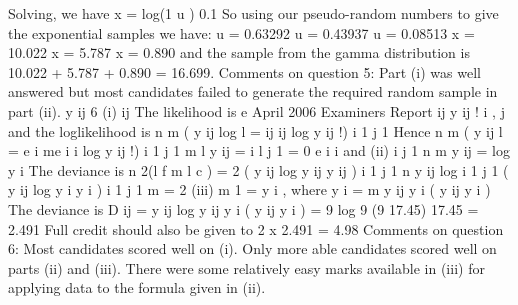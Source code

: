 \documentclass[a4paper,12pt]{article}
\begin{document}
Solving, we have x =
log(1 u )
0.1
So using our pseudo-random numbers to give the exponential samples we have:
u = 0.63292
u = 0.43937
u = 0.08513
x = 10.022
x = 5.787
x = 0.890
and the sample from the gamma distribution is
10.022 + 5.787 + 0.890 = 16.699.
Comments on question 5: Part (i) was well answered but most candidates failed to generate
the required random sample in part (ii).
y ij
6
(i)
ij
The likelihood is
e
April 2006
Examiners Report
ij
y ij !
i , j
and the loglikelihood is
n
m
( y ij log
l =
ij
ij
log y ij !)
i 1 j 1
Hence
n
m
( y ij
l =
e i
me i
i
log y ij !)
i 1 j 1
m
l
y ij
=
i
l
j 1
= 0
e
i
i
and
(ii)
i
j 1
n m
y ij
= log y i
The deviance is
n
2(l f
m
l c ) = 2
( y ij log y ij
y ij )
i 1 j 1
n
y ij log
i 1 j 1
( y ij log y i
y i )
i 1 j 1
m
= 2
(iii)
m
1
= y i , where y i =
m
y ij
y i
( y ij
y i )
The deviance is
D ij = y ij log
y ij
y i
( y ij
y i ) = 9 log
9
(9 17.45)
17.45
= 2.491
Full credit should also be given to 2 x 2.491 = 4.98
Comments on question 6: Most candidates scored well on (i). Only more able candidates
scored well on parts (ii) and (iii). There were some relatively easy marks available in (iii) for
applying data to the formula given in (ii).
\end{document}
